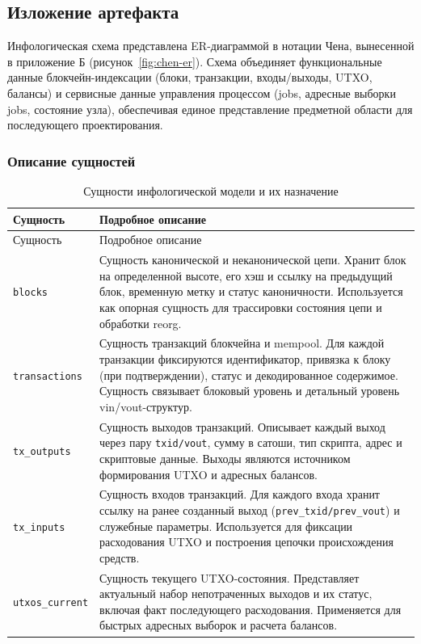 ﻿\documentclass[14pt,a4paper]{extarticle}
\begin{document}
\subsection{Изложение артефакта}
\noindent Инфологическая схема представлена ER-диаграммой в нотации Чена, вынесенной в приложение Б (рисунок~\ref{fig:chen-er}). Схема объединяет функциональные данные блокчейн-индексации (блоки, транзакции, входы/выходы, UTXO, балансы) и сервисные данные управления процессом (jobs, адресные выборки jobs, состояние узла), обеспечивая единое представление предметной области для последующего проектирования.

\subsubsection{Описание сущностей}
\begin{longtable}{p{} p{}}
\caption{Сущности инфологической модели и их назначение} \\
\toprule
Сущность & Подробное описание \\
\midrule
\endfirsthead
\toprule
Сущность & Подробное описание \\
\midrule
\endhead
\texttt{blocks} & Сущность канонической и неканонической цепи. Хранит блок на определенной высоте, его хэш и ссылку на предыдущий блок, временную метку и статус каноничности. Используется как опорная сущность для трассировки состояния цепи и обработки reorg. \\
\texttt{transactions} & Сущность транзакций блокчейна и mempool. Для каждой транзакции фиксируются идентификатор, привязка к блоку (при подтверждении), статус и декодированное содержимое. Сущность связывает блоковый уровень и детальный уровень vin/vout-структур. \\
\texttt{tx\_outputs} & Сущность выходов транзакций. Описывает каждый выход через пару \texttt{txid/vout}, сумму в сатоши, тип скрипта, адрес и скриптовые данные. Выходы являются источником формирования UTXO и адресных балансов. \\
\texttt{tx\_inputs} & Сущность входов транзакций. Для каждого входа хранит ссылку на ранее созданный выход (\texttt{prev\_txid/prev\_vout}) и служебные параметры. Используется для фиксации расходования UTXO и построения цепочки происхождения средств. \\
\texttt{utxos\_current} & Сущность текущего UTXO-состояния. Представляет актуальный набор непотраченных выходов и их статус, включая факт последующего расходования. Применяется для быстрых адресных выборок и расчета балансов. \\

\end{longtable}
\end{document}

